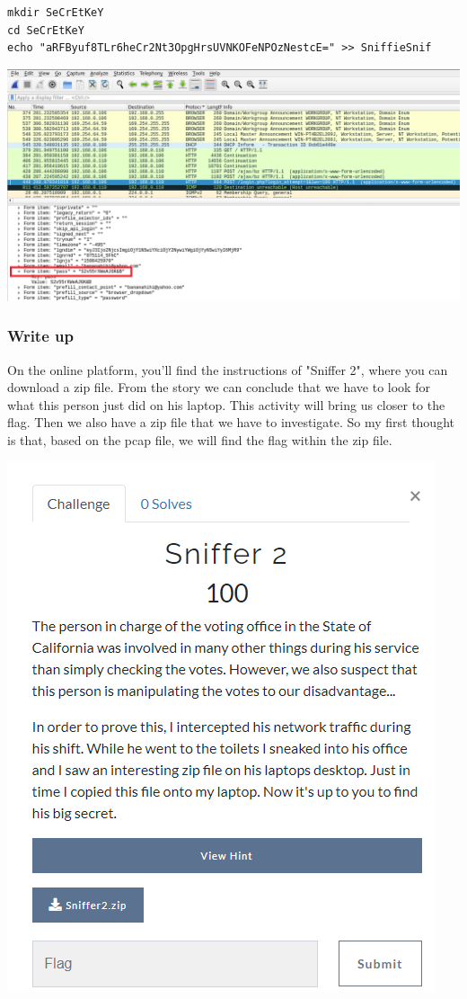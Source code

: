 \documentclass[../main.tex]{subfiles}
\begin{document}
\begin{lstlisting}
mkdir SeCrEtKeY
cd SeCrEtKeY
echo "aRFByuf8TLr6heCr2Nt3OpgHrsUVNKOFeNPOzNestcE=" >> SniffieSnif
\end{lstlisting}

 \begin{center}
    \includegraphics[width=1\linewidth]{images/Robbe/sniffer2_2.png}
\end{center}

\subsubsection{Write up}
On the online platform, you'll find the instructions of "Sniffer 2", where you can download a zip file. From the story we can conclude that we have to look for what this person just did on his laptop. This activity will bring us closer to the flag. Then we also have a zip file that we have to investigate. So my first thought is that, based on the pcap file, we will find the flag within the zip file.

 \begin{center}
    \includegraphics[width=0.5\linewidth]{images/Robbe/sniffer2_writeup1.png}
\end{center}
\end{document}
